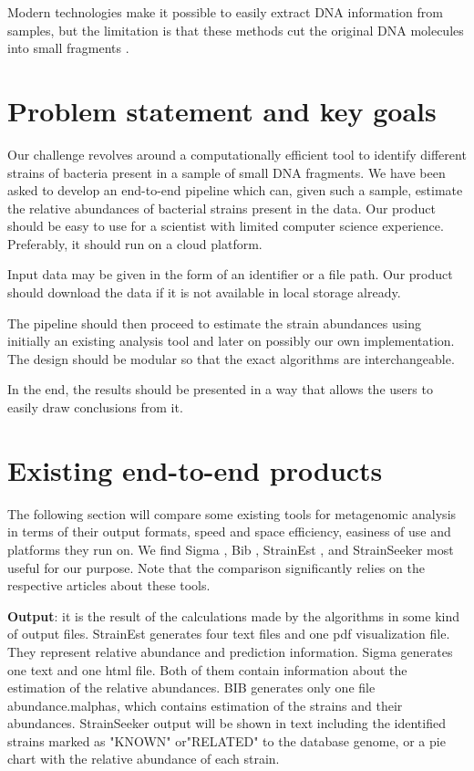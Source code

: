 \documentclass{report}
\begin{document}
Modern technologies make it possible to easily extract DNA information from samples, but the limitation is that these methods cut the original DNA molecules into small fragments \cite{mpgprimer}.


\section{Problem statement and key goals}
Our challenge revolves around a computationally efficient tool to identify different strains of bacteria present in a sample of small DNA fragments. We have been asked to develop an end-to-end pipeline which can, given such a sample, estimate the relative abundances of bacterial strains present in the data. Our product should be easy to use for a scientist with limited computer science experience. Preferably, it should run on a cloud platform.

Input data may be given in the form of an identifier or a file path. Our product should download the data if it is not available in local storage already.

The pipeline should then proceed to estimate the strain abundances using initially an existing analysis tool and later on possibly our own implementation. The design should be modular so that the exact algorithms are interchangeable.

In the end, the results should be presented in a way that allows the users to easily draw conclusions from it.


\section{Existing end-to-end products} \label{end-to-end}

The following section will compare some existing tools for metagenomic analysis in terms of their output formats, speed and space efficiency, easiness of use and platforms they run on. We find Sigma \cite{ahn2015sigma}, Bib \cite{mbs:/content/journal/mgen/10.1099/mgen.0.000075}, StrainEst \cite{StrainEst}, and StrainSeeker \cite{roosaare2017strainseeker} most useful for our purpose. Note that the comparison significantly relies on the respective articles about these tools.

\textbf{Output}: it is the result of the calculations made by the algorithms in some kind of output files. StrainEst generates four text files and one pdf visualization file. They represent relative abundance and prediction information. Sigma generates one text and one html file. Both of them contain information about the estimation of the relative abundances. BIB generates only one file abundance.m\textunderscore alphas, which contains estimation of the strains and their abundances. StrainSeeker output will be shown in text including the identified strains marked as "KNOWN" or"RELATED" to the database genome, or a pie chart with the relative abundance of each strain.
\end{document}
